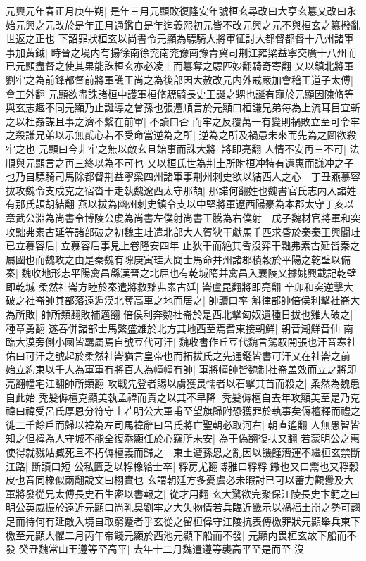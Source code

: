 元興元年春正月庚午朔|{
	是年三月元顯敗復隆安年號桓玄尋改曰大亨玄簒又改曰永始元興之元改於是年正月通鑑自是年迄義熙初元皆不改元興之元不與桓玄之簒撥亂世返之正也}
下詔罪狀桓玄以尚書令元顯為驃騎大將軍征討大都督都督十八州諸軍事加黄鉞|{
	時晉之境内有揚徐南徐兖南兖豫南豫青冀司荆江雍梁益寧交廣十八州而已元顯盡督之使其果能誅桓玄亦必凌上而簒奪之驃匹妙翻騎奇寄翻}
又以鎮北將軍劉牢之為前鋒都督前將軍譙王尚之為後部因大赦改元内外戒嚴加會稽王道子太傅|{
	會工外翻}
元顯欲盡誅諸桓中護軍桓脩驃騎長史王誕之甥也誕有寵於元顯因陳脩等與玄志趣不同元顯乃止誕導之曾孫也張灋順言於元顯曰桓謙兄弟每為上流耳目宜斬之以杜姦謀且事之濟不繫在前軍|{
	不讀曰否}
而牢之反覆萬一有變則禍敗立至可令牢之殺謙兄弟以示無貳心若不受命當逆為之所|{
	逆為之所及禍患未來而先為之圖欲殺牢之也}
元顯曰今非牢之無以敵玄且始事而誅大將|{
	將即亮翻}
人情不安再三不可|{
	法順與元顯言之再三終以為不可也}
又以桓氏世為荆土所附桓冲特有遺惠而謙冲之子也乃自驃騎司馬除都督荆益寧梁四州諸軍事荆州刺史欲以結西人之心　丁丑燕慕容拔攻魏令支戍克之宿沓干走執魏遼西太守那頡|{
	那諾何翻姓也魏書官氏志内入諸姓有那氏頡胡結翻}
燕以拔為幽州刺史鎮令支以中堅將軍遼西陽豪為本郡太守丁亥以章武公淵為尚書令博陵公䖍為尚書左僕射尚書王騰為右僕射　戊子魏材官將軍和突攻黜弗素古延等諸部破之初魏主珪遣北部大人賀狄干獻馬千匹求昏於秦秦王興聞珪已立慕容后|{
	立慕容后事見上卷隆安四年}
止狄干而絶其昏沒弈干黜弗素古延皆秦之屬國也而魏攻之由是秦魏有隙庚寅珪大閲士馬命并州諸郡積穀於平陽之乾壁以備秦|{
	魏收地形志平陽禽昌縣漢晉之北屈也有乾城隋并禽昌入襄陵又據姚興載記乾壁即乾城}
柔然社崙方睦於秦遣將救黜弗素古延|{
	崙盧昆翻將即亮翻}
辛卯和突逆擊大破之社崙帥其部落遠遁漠北奪高車之地而居之|{
	帥讀曰率}
斛律部帥倍侯利擊社崙大為所敗|{
	帥所類翻敗補邁翻}
倍侯利奔魏社崙於是西北擊匈奴遺種日拔也雞大破之|{
	種章勇翻}
遂吞併諸部士馬繁盛雄於北方其地西至焉耆東接朝鮮|{
	朝音潮鮮音仙}
南臨大漠旁側小國皆羈屬焉自號豆代可汗|{
	魏收書作丘豆代魏言駕馭開張也汗音寒社佑曰可汗之號起於柔然社崙猶言皇帝也而拓拔氏之先通鑑皆書可汗又在社崙之前}
始立約束以千人為軍軍有將百人為幢幢有帥|{
	軍將幢帥皆魏制社崙盖效而立之將即亮翻幢宅江翻帥所類翻}
攻戰先登者賜以虜獲畏懦者以石擊其首而殺之|{
	柔然為魏患自此始}
秃髪傉檀克顯美執孟禕而責之以其不早降|{
	秃髪傉檀自去年攻顯美至是乃克}
禕曰禕受呂氏厚恩分符守土若明公大軍甫至望旗歸附恐獲罪於執事矣傉檀釋而禮之徙二千餘戶而歸以褘為左司馬褘辭曰呂氏將亡聖朝必取河右|{
	朝直遙翻}
人無愚智皆知之但褘為人守城不能全復忝顯任於心竊所未安|{
	為于偽翻復扶又翻}
若蒙明公之惠使得就戮姑臧死且不朽傉檀義而歸之　東土遭孫恩之亂因以饑饉漕運不繼桓玄禁斷江路|{
	斷讀曰短}
公私匱乏以粰橡給士卒|{
	粰房尤翻博雅曰粰粰饊也又曰鬻也又稃穀皮也音同橡似兩翻說文曰栩實也}
玄謂朝廷方多憂虞必未暇討已可以蓄力觀釁及大軍將發從兄太傅長史石生密以書報之|{
	從才用翻}
玄大驚欲完聚保江陵長史卞範之曰明公英威振於遠近元顯口尚乳臭劉牢之大失物情若兵臨近畿示以禍福土崩之勢可翹足而待何有延敵入境自取窮蹙者乎玄從之留桓偉守江陵抗表傳檄罪狀元顯舉兵東下檄至元顯大懼二月丙午帝餞元顯於西池元顯下船而不發|{
	元顯内畏桓玄故下船而不發}
癸丑魏常山王遵等至高平|{
	去年十二月魏遣遵等襲高平至是而至}
沒

